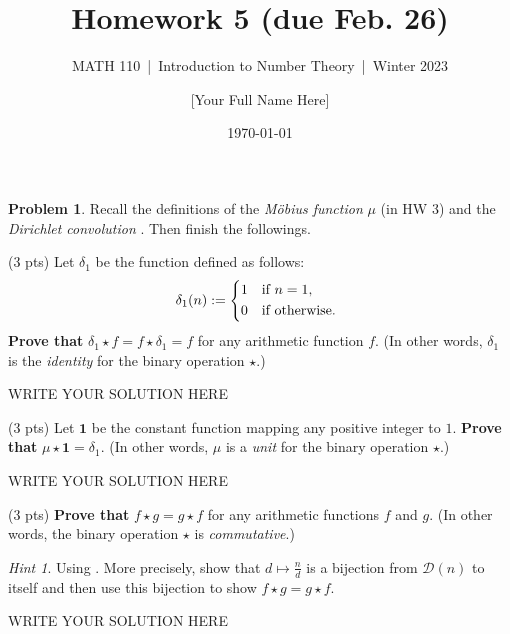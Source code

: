 \documentclass[11pt]{article}
\title{Homework 5 (due Feb. 26)}
\author{[Your Full Name Here]}
\subtitle{MATH 110~|~Introduction to Number Theory~|~Winter 2023}
\date{\today}
\theoremstyle{plain}
\theoremstyle{definition}
\newtheorem{problem}{Problem}
\theoremstyle{remark}
\newtheorem*{hint}{Hint}
\numberwithin{equation}{problem}
\begin{document}
\maketitle


\begin{problem}
	Recall the definitions of the \emph{M\"obius function} $\mu$ (in HW 3) and the \emph{Dirichlet convolution} \cite[Definition 16.5]{LecNote}. Then finish the followings.
	\begin{listinprob}
		\item (3 pts) Let $\delta_{1}$ be the function defined as follows:
		\[
			\delta_{1}(n) := 
			\begin{dcases*}
				1 & if $n=1$,\\
				0 & if otherwise.
			\end{dcases*}
		\]
		\textbf{Prove that} $\delta_{1}\star f = f\star\delta_{1} = f$ for any arithmetic function $f$.
		(In other words, $\delta_{1}$ is the \emph{identity} for the binary operation $\star$.)
\begin{solution} %
WRITE YOUR SOLUTION HERE
\end{solution}\clearpage %

		\item (3 pts) Let $\bm{1}$ be the constant function mapping any positive integer to $1$. \textbf{Prove that} $\mu\star\bm{1}=\delta_{1}$. (In other words, $\mu$ is a \emph{unit} for the binary operation $\star$.)
\begin{solution} %
WRITE YOUR SOLUTION HERE
\end{solution}\clearpage %

		\item (3 pts) \textbf{Prove that} $f\star g = g\star f$ for any arithmetic functions $f$ and $g$. (In other words, the binary operation $\star$ is \emph{commutative}.)
		\begin{hint}
			Using \cite[Exercise 7.1]{LecNote}.
			More precisely, show that $d\mapsto \frac{n}{d}$ is a bijection from $\mathscr{D}(n)$ to itself and then use this bijection to show $f\star g = g\star f$.
		\end{hint}
\begin{solution} %
WRITE YOUR SOLUTION HERE
\end{solution}\clearpage %


\end{listinprob}
\end{problem}
\end{document}
